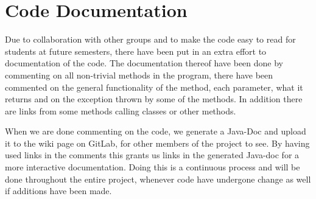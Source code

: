 \section{Code Documentation} \label{sec:code_documentation}
Due to collaboration with other groups and to make the code easy to read for students at future semesters, there have been put in an extra effort to documentation of the code. The documentation thereof have been done by commenting on all non-trivial methods in the program, there have been commented on the general functionality of the method, each parameter, what it returns and on the exception thrown by some of the methods. In addition there are links from some methods calling classes or other methods. 

When we are done commenting on the code, we generate a Java-Doc and upload it to the wiki page on GitLab, for other members of the project to see. By having used links in the comments this grants us links in the generated Java-doc for a more interactive documentation. 
Doing this is a continuous process and will be done throughout the entire project, whenever code have undergone change as well if additions have been made.